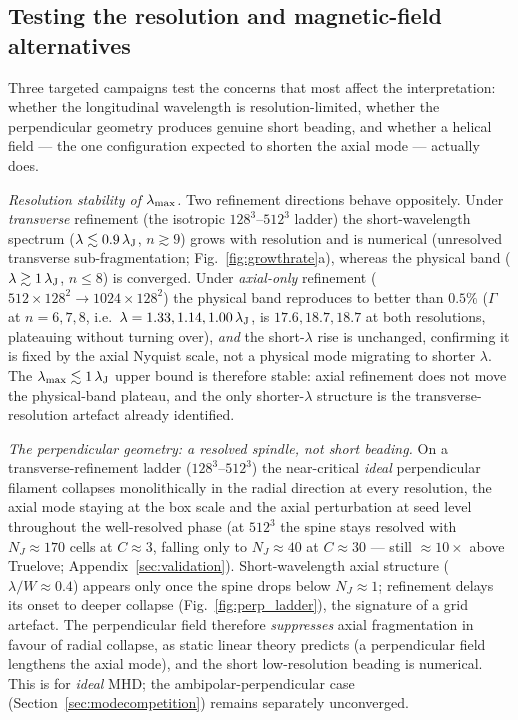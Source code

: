 \documentclass[usenatbib,twoside,twocolumn]{mnras}
\begin{document}
\subsection{Testing the resolution and magnetic-field alternatives}
\label{sec:optional_tests}
Three targeted campaigns test the concerns that most affect the interpretation: whether the longitudinal wavelength is resolution-limited, whether the perpendicular geometry produces genuine short beading, and whether a helical field --- the one configuration expected to shorten the axial mode --- actually does.

\emph{Resolution stability of $\lambda_{\rm max}$.} Two refinement directions behave oppositely. Under \emph{transverse} refinement (the isotropic $128^3$--$512^3$ ladder) the short-wavelength spectrum ($\lambda\lesssim0.9\,\lambda_{\rm J}$, $n\gtrsim9$) grows with resolution and is numerical (unresolved transverse sub-fragmentation; Fig.~\ref{fig:growthrate}a), whereas the physical band ($\lambda\gtrsim1\,\lambda_{\rm J}$, $n\leq8$) is converged. Under \emph{axial-only} refinement ($512\times128^2\to1024\times128^2$) the physical band reproduces to better than $0.5\%$ ($\Gamma$ at $n=6,7,8$, i.e.\ $\lambda=1.33,1.14,1.00\,\lambda_{\rm J}$, is $17.6,18.7,18.7$ at both resolutions, plateauing without turning over), \emph{and} the short-$\lambda$ rise is unchanged, confirming it is fixed by the axial Nyquist scale, not a physical mode migrating to shorter $\lambda$. The $\lambda_{\rm max}\lesssim1\,\lambda_{\rm J}$ upper bound is therefore stable: axial refinement does not move the physical-band plateau, and the only shorter-$\lambda$ structure is the transverse-resolution artefact already identified.

\emph{The perpendicular geometry: a resolved spindle, not short beading.} On a transverse-refinement ladder ($128^3$--$512^3$) the near-critical \emph{ideal} perpendicular filament collapses monolithically in the radial direction at every resolution, the axial mode staying at the box scale and the axial perturbation at seed level throughout the well-resolved phase (at $512^3$ the spine stays resolved with $N_J\approx170$ cells at $C\approx3$, falling only to $N_J\approx40$ at $C\approx30$ --- still $\approx10\times$ above Truelove; Appendix~\ref{sec:validation}). Short-wavelength axial structure ($\lambda/W\approx0.4$) appears only once the spine drops below $N_J\approx1$; refinement delays its onset to deeper collapse (Fig.~\ref{fig:perp_ladder}), the signature of a grid artefact. The perpendicular field therefore \emph{suppresses} axial fragmentation in favour of radial collapse, as static linear theory predicts (a perpendicular field lengthens the axial mode), and the short low-resolution beading is numerical. This is for \emph{ideal} MHD; the ambipolar-perpendicular case (Section~\ref{sec:modecompetition}) remains separately unconverged.
\end{document}
